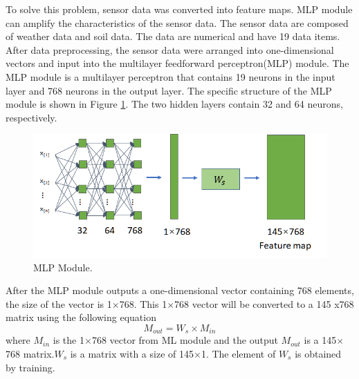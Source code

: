 \documentclass[acmsmall,manuscript, screen, review]{acmart}
\begin{document}
To solve this problem, sensor data was converted into feature maps. MLP module can amplify the characteristics of the sensor data. The sensor data are composed of weather data and soil data. The data are numerical and have 19 data items. After data preprocessing, the sensor data were arranged into one-dimensional vectors and input into the multilayer feedforward perceptron(MLP) module. The MLP module is a multilayer perceptron that contains 19 neurons in the input layer and 768 neurons in the output layer. The specific structure of the MLP module is shown in Figure \ref{mlp_module}. The two hidden layers contain 32 and 64 neurons, respectively.
\begin{figure}[htbp]
  \centering
  \includegraphics[width=0.7\linewidth]{pic/mlp_module.png}
  \caption{MLP Module.}
  \label{mlp_module}
\end{figure}

After the MLP module outputs a one-dimensional vector containing 768 elements, the size of the vector is 1\begin{math}
  \times
\end{math}768. This 1\begin{math}
  \times
\end{math}768 vector will be converted to a 145 x768 matrix using the following equation
\begin{equation}
  M_{out}=W_s\times M_{in}
\end{equation}
where \begin{math}
  M_{in}
\end{math} is the 1\begin{math}
  \times
\end{math}768 vector from ML module and the output \begin{math}
  M_{out}
\end{math} is a 145\begin{math}
  \times
\end{math}768 matrix.\begin{math}
  W_s
\end{math} is a matrix with a size of 145\begin{math}
  \times
\end{math}1. The element of \begin{math}
  W_s
\end{math} is obtained by training. 
\end{document}
